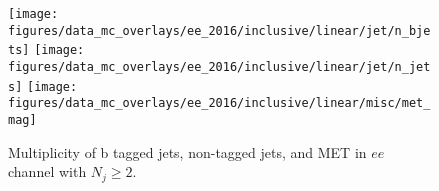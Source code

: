 \begin{figure}[htb!]
    \centering
    \texttt{[image: figures/data\_mc\_overlays/ee\_2016/inclusive/linear/jet/n\_bjets]}
    \texttt{[image: figures/data\_mc\_overlays/ee\_2016/inclusive/linear/jet/n\_jets]}
    \texttt{[image: figures/data\_mc\_overlays/ee\_2016/inclusive/linear/misc/met\_mag]}
    \caption{Multiplicity of b tagged jets, non-tagged jets, and MET in
    $ee$ channel with $N_{j} \geq 2$.}
    \label{fig:ee_jetmet}
\end{figure}

